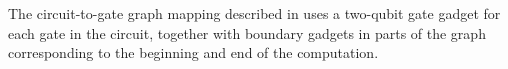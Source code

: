 \documentclass[../thesis-main/thesis-main]{subfiles}
\begin{document}
The circuit-to-gate graph mapping described in  uses a two-qubit gate gadget for each gate in the circuit, together with boundary gadgets in parts of the graph corresponding to the beginning and end of the computation.
%
%
%
\end{document}
